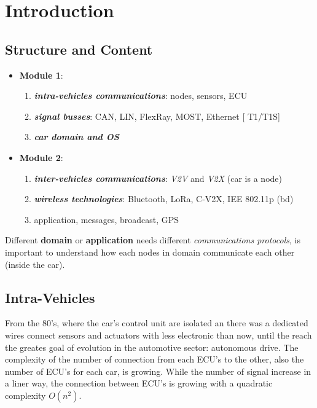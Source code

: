 \chapter{Introduction}

\section{Structure and Content}
\begin{itemize}

    \item \textbf{Module 1}: 
    \begin{enumerate}
        \item \textbf{\textit{intra-vehicles communications}}: nodes, sensors, ECU
        \item \textbf{\textit{signal busses}}: CAN, LIN, FlexRay, MOST, Ethernet [ T1/T1S]
        \item \textbf{\textit{car domain and OS}}
    \end{enumerate}
    
    \item \textbf{Module 2}:
    \begin{enumerate}
        \item \textbf{\textit{inter-vehicles communications}}: \textit{V2V} and \textit{V2X} (car is a node)
        \item \textbf{\textit{wireless technologies}}: Bluetooth, LoRa, C-V2X, IEE 802.11p (bd)
        \item application, messages, broadcast, GPS
    \end{enumerate}

\end{itemize}
Different \textbf{domain} or \textbf{application} needs different \textit{communications protocols}, is important to understand how each nodes in domain communicate each other (inside the car).

\newpage
\section{Intra-Vehicles}
From the 80's, where the car's control unit are isolated an there was a dedicated wires connect sensors and actuators with less electronic than now, until the reach the greates goal of evolution in the automotive sector: autonomous drive. The complexity of the number of connection from each ECU's to the other, also the number of ECU's for each car, is growing. While the number of signal increase in a liner way, the connection between ECU's is growing with a quadratic complexity $O(n^2)$.


